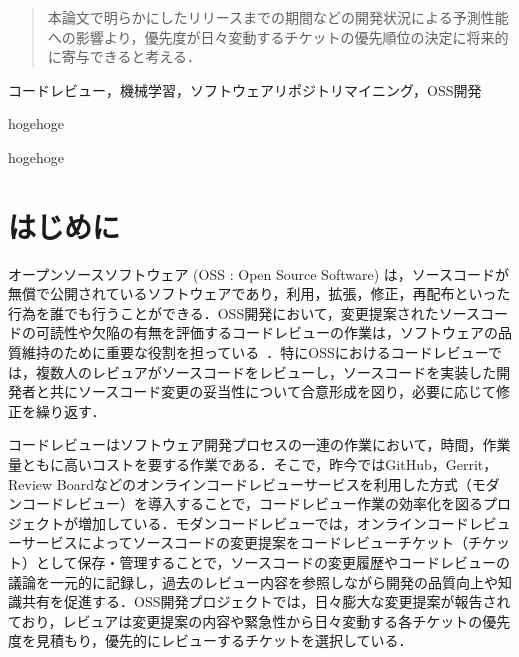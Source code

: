 \documentclass[submit]{ipsj}
\begin{document}
\begin{abstract}
本論文で明らかにしたリリースまでの期間などの開発状況による予測性能への影響より，優先度が日々変動するチケットの優先順位の決定に将来的に寄与できると考える．
\end{abstract}


\begin{jkeyword}
コードレビュー，機械学習，ソフトウェアリポジトリマイニング，OSS開発
\end{jkeyword}

\begin{eabstract}
hogehoge
\end{eabstract}

\begin{ekeyword}
hogehoge
\end{ekeyword}

\maketitle

\section{はじめに}

オープンソースソフトウェア (OSS : Open Source Software) は，ソースコードが無償で公開されているソフトウェアであり，利用，拡張，修正，再配布といった行為を誰でも行うことができる．OSS開発において，変更提案されたソースコードの可読性や欠陥の有無を評価するコードレビューの作業は，ソフトウェアの品質維持のために重要な役割を担っている~\cite{quality1}\cite{quality2}．特にOSSにおけるコードレビューでは，複数人のレビュアがソースコードをレビューし，ソースコードを実装した開発者と共にソースコード変更の妥当性について合意形成を図り，必要に応じて修正を繰り返す．

コードレビューはソフトウェア開発プロセスの一連の作業において，時間，作業量ともに高いコストを要する作業である\cite{cost}．そこで，昨今ではGitHub，Gerrit，Review Boardなどのオンラインコードレビューサービスを利用した方式（モダンコードレビュー\cite{quality1}）を導入することで，コードレビュー作業の効率化を図るプロジェクトが増加している．モダンコードレビューでは，オンラインコードレビューサービスによってソースコードの変更提案をコードレビューチケット（チケット）として保存・管理することで，ソースコードの変更履歴やコードレビューの議論を一元的に記録し，過去のレビュー内容を参照しながら開発の品質向上や知識共有を促進する．OSS開発プロジェクトでは，日々膨大な変更提案が報告されており，レビュアは変更提案の内容や緊急性から日々変動する各チケットの優先度を見積もり，優先的にレビューするチケットを選択している\cite{integrator}．
\end{document}
